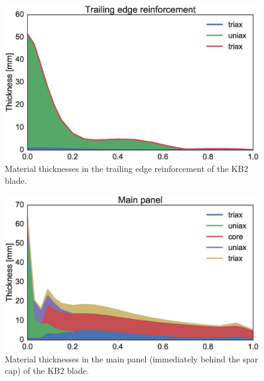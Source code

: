 
\begin{figure}[!ht]
\begin{center}
	\includegraphics[width=.85\linewidth]{figures/KB2_region01.eps}
\end{center}
\caption{Material thicknesses in the trailing edge reinforcement of the KB2 blade.}
\label{fig:KB2matstackr01}
\end{figure}

\begin{figure}[!ht]
\begin{center}
	\includegraphics[width=.85\linewidth]{figures/KB2_region02.eps}
\end{center}
\caption{Material thicknesses in the main panel (immediately behind the spar cap) of the KB2 blade.}
\label{fig:KB2matstackr02}
\end{figure}

